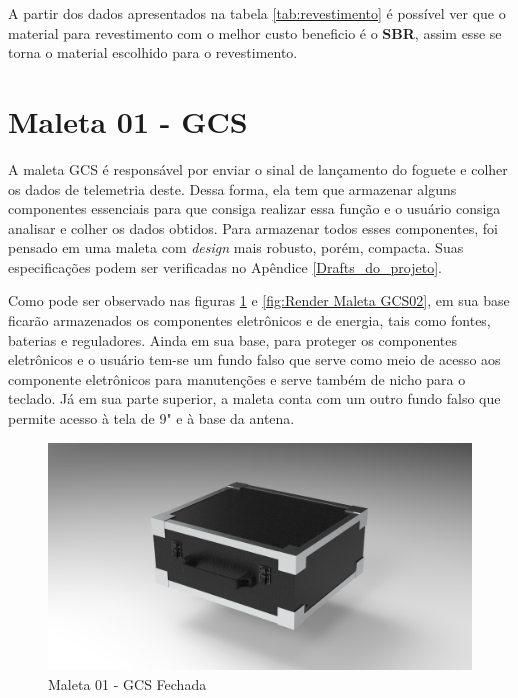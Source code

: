 \par A partir dos dados apresentados na tabela \ref{tab:revestimento} é possível ver que o material para revestimento com o melhor custo beneficio é o \textbf{SBR}, assim esse se torna o material escolhido para o revestimento. 

\section{Maleta 01 - GCS}
\label{maleta_01}

\par A maleta GCS é responsável por enviar o sinal de lançamento do foguete e colher os dados de telemetria deste. Dessa forma, ela tem que armazenar alguns componentes essenciais para que consiga realizar essa função e o usuário consiga analisar e colher os dados obtidos. Para armazenar todos esses componentes, foi pensado em uma maleta com \textit{design} mais robusto, porém, compacta. Suas especificações podem ser verificadas no Apêndice \ref{Drafts_do_projeto}.

\par Como pode ser observado nas figuras \ref{fig:Render Maleta GCS01} e \ref{fig:Render Maleta GCS02}, em sua base ficarão armazenados os componentes eletrônicos e de energia, tais como fontes, baterias e reguladores. Ainda em sua base, para proteger os componentes eletrônicos e o usuário tem-se um fundo falso que serve como meio de acesso aos componente eletrônicos para manutenções e serve também de nicho para o teclado. Já em sua parte superior, a maleta conta com um outro fundo falso que permite acesso à tela de 9" e à base da antena.

\begin{figure}[H]
    \centering
        \includegraphics[width=0.7\linewidth]{figuras/untitled.17.jpg}
    \caption{\label{fig:Render Maleta GCS01} Maleta 01 - GCS Fechada}
\end{figure}

